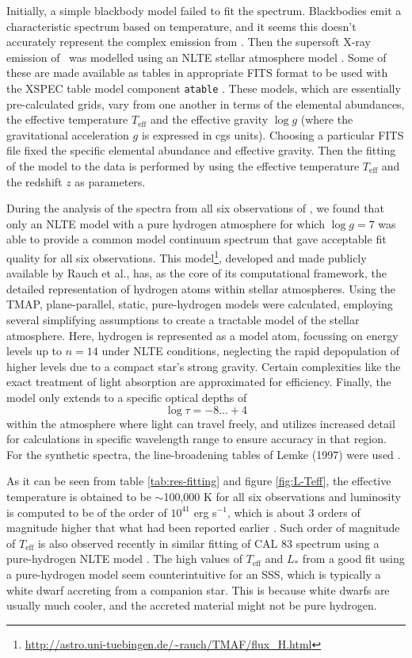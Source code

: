     Initially, a simple blackbody model failed to fit the spectrum. Blackbodies emit a characteristic spectrum based on temperature, and it seems this doesn't accurately represent the complex emission from \source. Then the supersoft X-ray emission of \source\ was modelled using an NLTE stellar atmosphere model \cite{werner1999classical}. Some of these are made available as tables in appropriate FITS format to be used with the XSPEC table model component \texttt{atable} \cite{rauch2003grid,rauch2010nlte}. These models, which are essentially pre-calculated grids, vary from one another in terms of the elemental abundances, the effective temperature $T_\text{eff}$ and the effective gravity $\log{g}$ (where the gravitational acceleration $g$ is expressed in cgs units). Choosing a particular FITS file fixed the specific elemental abundance and effective gravity. Then the fitting of the model to the data is performed by using the effective temperature $T_\text{eff}$ and the redshift $z$ as parameters.
    
    During the analysis of the spectra from all six observations of \source, we found that only an NLTE model with a pure hydrogen atmosphere for which $\log{g}=7$ was able to provide a common model continuum spectrum that gave acceptable fit quality for all six observations. This model\footnote{\url{http://astro.uni-tuebingen.de/~rauch/TMAF/flux_H.html}}, developed and made publicly available by Rauch et al., has, as the core of its computational framework, the detailed representation of hydrogen atoms within stellar atmospheres. Using the TMAP,  plane-parallel, static, pure-hydrogen models were calculated, employing several simplifying assumptions to create a tractable model of the stellar atmosphere. Here, hydrogen is represented as a model atom, focussing on energy levels up to $n=14$ under NLTE conditions, neglecting the rapid depopulation of higher levels due to a compact star's strong gravity. Certain complexities like the exact treatment of light absorption are approximated for efficiency. Finally, the model only extends to a specific optical depths of
    $$\log{\tau}=-8\dots+4$$
    within the atmosphere where light can travel freely, and utilizes increased detail for calculations in specific wavelength range to ensure accuracy in that region. For the synthetic spectra, the line-broadening tables of Lemke (1997) were used \cite{lemke1997extended}.
    
    As it can be seen from table \ref{tab:res-fitting} and figure \ref{fig:L-Teff}, the effective temperature is obtained to be $\sim$100,000 K for all six observations and luminosity is computed to be of the order of $10^{41}$ erg s$^{-1}$, which is about 3 orders of magnitude higher that what had been reported earlier \cite{hartmann1999constraining}. Such order of magnitude of $T_\text{eff}$ is also observed recently in similar fitting of CAL 83 spectrum using a pure-hydrogen NLTE model \cite{stecchini2023revisiting}. The high values of $T_\text{eff}$ and $L_*$ from a good fit using a pure-hydrogen model seem counterintuitive for an SSS, which is typically a white dwarf accreting from a companion star. This is because white dwarfs are usually much cooler, and the accreted material might not be pure hydrogen.
    
